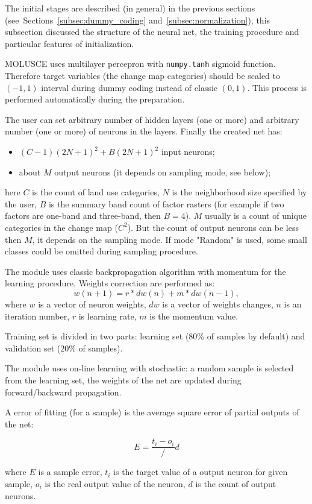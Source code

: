\documentclass{report}
\begin{document}
The initial stages are described (in general) in the previous sections (see~Sections~\ref{subsec:dummy_coding} and~\ref{subsec:normalization}), this subsection discussed the structure of the neural net, the training procedure and particular features of initialization. 

MOLUSCE uses multilayer percepron with \verb+numpy.tanh+ sigmoid function. Therefore target variables (the change map categories) should be scaled to $(-1, 1)$ interval during dummy coding instead of classic $(0, 1)$. This process is performed automatically during the preparation.

The user can set arbitrary number of hidden layers (one or more) and arbitrary number (one or more) of neurons in the layers.
Finally the created net has:
\begin{itemize}
  \item $(C-1)(2N+1)^{2}+B(2N+1)^{2}$ input neurons;
  \item about $M$ output neurons (it depends on sampling mode, see below);
\end{itemize}
here $C$ is the count of land use categories, $N$ is the neighborhood size specified by the user, $B$ is the summary band count of factor rasters (for example if two factors are one-band and three-band, then $B=4$). $M$ usually is a count of unique categories in the change map ($C^{2}$). But the count of output neurons can be less then $M$, it depends on the sampling mode. If mode "Random" is used, some small classes could be omitted during sampling procedure. 

The module uses classic backpropagation algorithm with momentum for the learning procedure. Weights correction are performed as:
$$
w(n+1)=r*dw(n)+m*dw(n-1),
$$
where $w$ is a vector of neuron weights, $dw$ is a vector of weights changes, $n$ is an iteration number, $r$ is learning rate, $m$ is the momentum value. 

Training set is divided in two parts: learning set (80\% of samples by default) and validation set (20\% of samples). 

The module uses on-line learning with stochastic: a random sample is selected from the learning set, the weights of the net are updated during forward/backward propagation.

A error of fitting (for a sample) is the average square error of partial outputs of the net:

$$
E = \frac{t_i - o_i}/d
$$

where $E$ is a sample error, $t_{i}$ is the target value of a output neuron for given sample, $o_{i}$ is the real output value of the neuron, $d$ is the count of output neurons. 
\end{document}
